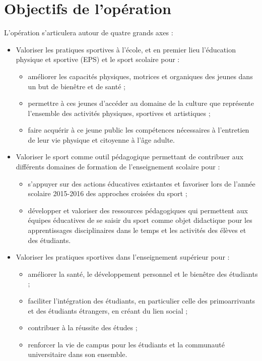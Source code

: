 \section{Objectifs de l’opération}
L’opération s’articulera autour de quatre grands axes :
\begin{itemize}
\item Valoriser les pratiques sportives à l’école, et en premier lieu l’éducation physique et sportive (EPS) et le sport scolaire pour :
	\begin{itemize}
	\item améliorer les capacités physiques, motrices et organiques des jeunes dans un but de bienêtre et de santé ;
	\item permettre à ces jeunes d’accéder au domaine de la culture que représente l’ensemble des activités physiques, sportives et artistiques ;
	\item faire acquérir à ce jeune public les compétences nécessaires à l’entretien de leur vie physique et citoyenne à l’âge adulte.
	\end{itemize}
\item Valoriser le sport comme outil pédagogique permettant de contribuer aux différents domaines de formation de l’enseignement scolaire pour :
	\begin{itemize}
	\item s’appuyer sur des actions éducatives existantes et favoriser lors de l’année scolaire 2015-2016 des approches croisées du sport ;
	\item développer et valoriser des ressources pédagogiques qui permettent aux équipes éducatives de se saisir du sport comme objet didactique pour les apprentissages disciplinaires dans le temps et les activités des élèves et des étudiants.
	\end{itemize}
\item Valoriser les pratiques sportives dans l’enseignement supérieur pour :
	\begin{itemize}
	\item améliorer la santé, le développement personnel et le bienêtre des étudiants ;
	\item faciliter l’intégration des étudiants, en particulier celle des primoarrivants et des étudiants étrangers, en créant du lien social ;
	\item contribuer à la réussite des études ;
	\item renforcer la vie de campus pour les étudiants et la communauté universitaire dans son ensemble.
	\end{itemize}

\end{itemize}
